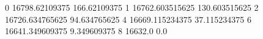 0 16798.62109375 166.62109375
1 16762.603515625 130.603515625
2 16726.634765625 94.634765625
4 16669.115234375 37.115234375
6 16641.349609375 9.349609375
8 16632.0 0.0
